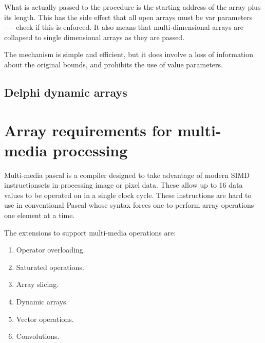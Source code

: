 What is actually passed to the procedure is the starting
address of the array plus its length. This has the side
effect that all open arrays must be var parameters ----
check if this is enforced.
It also means that multi-dimensional arrays are collapsed
to single dimensional arrays as they are passed.

The mechanism is simple and efficient, but it does
involve a loss of information about the original
bounds, and prohibits the use of value parameters.
\subsection*{Delphi dynamic arrays}
\section*{Array requirements for multi-media processing}
Multi-media pascal is a compiler designed to take advantage
of modern SIMD instructionsets in processing image or 
pixel data. These allow up to 16 data values to be
operated on in a single clock cycle.
These instructions are hard to use in conventional
Pascal whose syntax forces one to perform array operations
one element at a time.

The extensions to support multi-media operations are:
\begin{enumerate}
\item Operator overloading.
\item Saturated operations.
\item Array slicing.
\item Dynamic arrays.
\item Vector operations.
\item Convolutions.
\end{enumerate}


